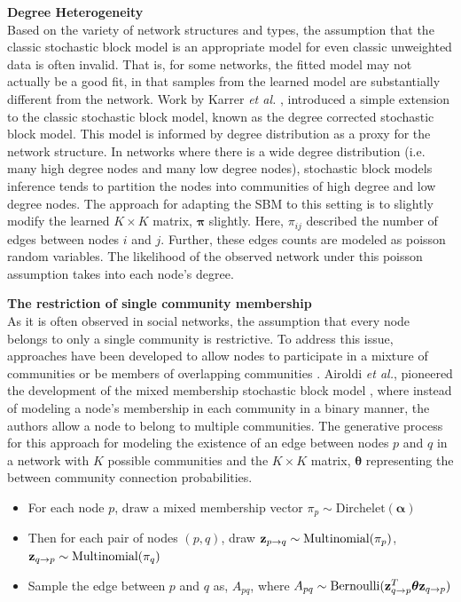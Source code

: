 {\bf Degree Heterogeneity}\\
\indent Based on the variety of network structures and types, the assumption that the classic stochastic block model is an appropriate model for even classic unweighted data is often invalid. That is, for some networks, the fitted model may not actually be a good fit, in that samples from the learned model are substantially different from the network. Work by Karrer \emph{et al.} \cite{degreecorrectSBM}, introduced a simple extension to the classic stochastic block model, known as the degree corrected stochastic block model. This model is informed by degree distribution as a proxy for the network structure. In networks where there is a wide degree distribution (i.e. many high degree nodes and many low degree nodes), stochastic block models inference tends to partition the nodes into communities of high degree and low degree nodes. The approach for adapting the SBM to this setting is to slightly modify the learned $K \times K$ matrix, ${\boldsymbol \pi}$ slightly. Here, $\pi_{ij}$ described the number of edges between nodes $i$ and $j$. Further, these edges counts are modeled as poisson random variables. The likelihood of the observed network under this poisson assumption takes into each node's degree. 

{\bf The restriction of single community membership}\\
\indent As it is often observed in social networks, the assumption that every node belongs to only a single community is restrictive. To address this issue, approaches have been developed to  allow nodes to  participate in a mixture of communities \cite{mixMember} or be members of overlapping communities \cite{LA}. Airoldi \emph{et al.}, pioneered the development of the mixed membership stochastic block model \cite{mixMember}, where instead of modeling a node's membership in each community in a binary manner, the authors allow a node to belong to multiple communities. The generative process for this approach for modeling the existence of an edge between nodes $p$ and $q$ in a network with $K$ possible communities and the $K \times K$ matrix, ${\boldsymbol \theta}$ representing the between community connection probabilities.

\begin{itemize}
\item For each node $p$, draw a mixed membership vector $\pi_{p}\sim \text{Dirchelet}({\boldsymbol \alpha})$
\item Then for each pair of nodes $(p,q)$, draw ${\bf z}_{p\rightarrow q} \sim \text{Multinomial}(\pi_{p})$, ${\bf z}_{q\rightarrow p} \sim \text{Multinomial}(\pi_{q})$
\item Sample the edge between $p$ and $q$ as, $A_{pq}$, where $A_{pq} \sim \text{Bernoulli}({\bf z}_{q\rightarrow p}^{T}{\boldsymbol \theta}{\bf z}_{q\rightarrow p})$
\end{itemize} 

